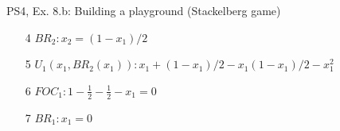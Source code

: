 \begin{frame}{PS4, Ex. 8.b: Building a playground (Stackelberg game)}
\begin{multicols}{2}
\begin{itemize}
      \item[4] \begin{math}BR_2: x_2=(1-x_1)/2 \end{math}
      \item[5] \begin{math}U_1(x_1,BR_2(x_1)): x_1+(1-x_1)/2-x_1(1-x_1)/2-x_1^2 \end{math}
      \item[6] \begin{math}FOC_1: 1-\frac{1}{2}-\frac{1}{2}-x_1=0 \end{math}
      \item[7] \begin{math}BR_1: x_1=0 \end{math}
    \end{itemize}
    \vfill\null
  \end{multicols}
\end{frame}

